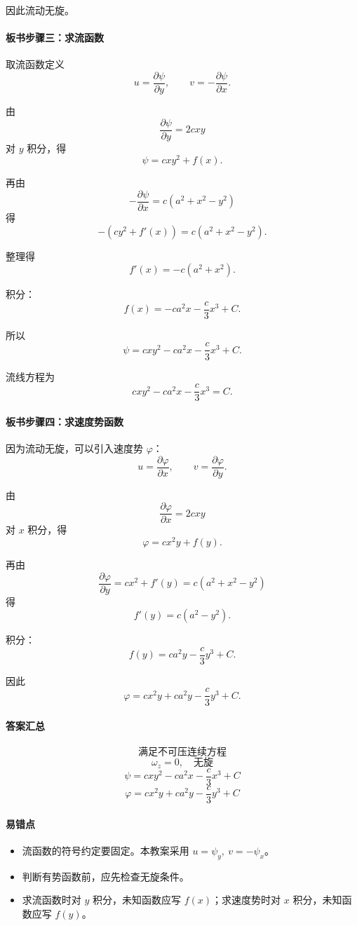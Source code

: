 \documentclass[12pt,a4paper]{ctexart}
\begin{document}
因此流动无旋。

\paragraph{板书步骤三：求流函数}
取流函数定义
\[
u=\frac{\partial\psi}{\partial y},
\qquad
v=-\frac{\partial\psi}{\partial x}.
\]

由
\[
\frac{\partial\psi}{\partial y}=2cxy
\]
对 $y$ 积分，得
\[
\psi=cxy^2+f(x).
\]

再由
\[
-\frac{\partial\psi}{\partial x}
=c(a^2+x^2-y^2)
\]
得
\[
-\left(cy^2+f'(x)\right)
=c(a^2+x^2-y^2).
\]

整理得
\[
f'(x)=-c(a^2+x^2).
\]

积分：
\[
f(x)=-ca^2x-\frac c3x^3+C.
\]

所以
\[
\boxed{
\psi=cxy^2-ca^2x-\frac c3x^3+C.
}
\]

流线方程为
\[
\boxed{
cxy^2-ca^2x-\frac c3x^3=C.
}
\]

\paragraph{板书步骤四：求速度势函数}
因为流动无旋，可以引入速度势 $\varphi$：
\[
u=\frac{\partial\varphi}{\partial x},
\qquad
v=\frac{\partial\varphi}{\partial y}.
\]

由
\[
\frac{\partial\varphi}{\partial x}=2cxy
\]
对 $x$ 积分，得
\[
\varphi=cx^2y+f(y).
\]

再由
\[
\frac{\partial\varphi}{\partial y}
=cx^2+f'(y)
=c(a^2+x^2-y^2)
\]
得
\[
f'(y)=c(a^2-y^2).
\]

积分：
\[
f(y)=ca^2y-\frac c3y^3+C.
\]

因此
\[
\boxed{
\varphi=cx^2y+ca^2y-\frac c3y^3+C.
}
\]

\paragraph{答案汇总}
\[
\boxed{\text{满足不可压连续方程}}
\]
\[
\boxed{\omega_z=0,\quad \text{无旋}}
\]
\[
\boxed{
\psi=cxy^2-ca^2x-\frac c3x^3+C
}
\]
\[
\boxed{
\varphi=cx^2y+ca^2y-\frac c3y^3+C
}
\]

\paragraph{易错点}
\begin{itemize}
  \item 流函数的符号约定要固定。本教案采用 $u=\psi_y,\ v=-\psi_x$。
  \item 判断有势函数前，应先检查无旋条件。
  \item 求流函数时对 $y$ 积分，未知函数应写 $f(x)$；求速度势时对 $x$ 积分，未知函数应写 $f(y)$。
\end{itemize}
\end{document}
